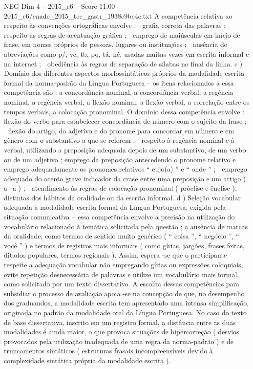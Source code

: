 \begin{textsample}{NEG Dim 4 – 2015\_c6 – Score 11.00 – 2015\_c6/enade\_2015\_tec\_gastr\_1938c9be4e.txt}
A competência relativa ao respeito às convenções ortográficas envolve :  grafia correta das palavras ;  respeito às regras de acentuação gráfica ;  emprego de maiúsculas em início de frase, em nomes próprios de pessoas, lugares ou instituições ;  ausência de abreviações como p/, vc, tb, pq, tá, né, usadas muitas vezes em escrita informal e na internet ;  obediência às regras de separação de sílabas no final da linha. c ) Domínio dos diferentes aspectos morfossintáticos próprios da modalidade escrita formal da norma-padrão da Língua Portuguesa – os itens relacionados a essa competência são : a concordância nominal, a concordância verbal, a regência nominal, a regência verbal, a flexão nominal, a flexão verbal, a correlação entre os tempos verbais, a colocação pronominal.
O domínio dessa competência envolve :  flexão do verbo para estabelecer concordância de número com o sujeito da frase ;  flexão do artigo, do adjetivo e do pronome para concordar em número e em gênero com o substantivo a que se referem ;  respeito à regência nominal e à verbal, utilizando a preposição adequada depois de um substantivo, de um verbo ou de um adjetivo ; emprego da preposição antecedendo o pronome relativo e emprego adequadamente os pronomes relativos “ cujo(a) ” e “ onde ” ;  emprego adequado do acento grave indicador da crase entre uma preposição e um artigo ( a+a ) ;  atendimento às regras de colocação pronominal ( próclise e ênclise ), distintas dos hábitos da oralidade ou da escrita informal. d ) Seleção vocabular adequada à modalidade escrita formal da Língua Portuguesa, exigida pela situação comunicativa – essa competência envolve a precisão na utilização do vocabulário relacionado à temática solicitada pela questão ; a ausência de marcas da oralidade, como termos de sentido muito genérico ( “ coisa ”, “ negócio ”, “ você ” ) e termos de registros mais informais ( como gírias, jargões, frases feitas, ditados populares, termos regionais ).
Assim, espera -se que o participante respeite a adequação vocabular não empregando gírias ou expressões coloquiais, evite repetição desnecessária de palavras e utilize um vocabulário mais formal, como solicitado por um texto dissertativo.
A escolha dessas competências para subsidiar o processo de avaliação apoia -se na concepção de que, no desempenho dos graduandos, a modalidade escrita tem apresentado uma intensa simplificação, originada no padrão da modalidade oral da Língua Portuguesa.
No caso do texto de base dissertativa, inscrito em um registro formal, a distância entre as duas modalidades é ainda maior, o que provoca situações de hipercorreção ( desvios provocados pela utilização inadequada de uma regra da norma-padrão ) e de truncamentos sintáticos ( estruturas frasais incompreensíveis devido à complexidade sintática própria da modalidade escrita ).

\end{textsample}
